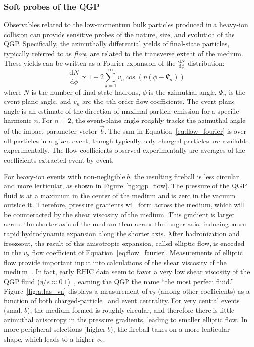 \subsubsection{Soft probes of the QGP}

Observables related to the low-momentum bulk particles produced in a heavy-ion collision can provide sensitive probes of the nature, size, and evolution of the QGP.
Specifically, the azimuthally differential yields of final-state particles, typically referred to as \textit{flow}, are related to the transverse extent of the medium.
These yields can be written as a Fourier expansion of the $\frac{\mathrm{d}N}{\mathrm{d}\phi}$ distribution:
\begin{equation}
    \label{eq:flow_fourier}
    \frac{\mathrm{d}N}{\mathrm{d}\phi}
    \propto 1 + 2\sum_{n=1}^{\infty}
    v_n\cos\left(n(\phi-\Psi_n)\right)
\end{equation}
where $N$ is the number of final-state hadrons, $\phi$ is the azimuthal angle, $\Psi_n$ is the event-plane angle, and $v_n$ are the $n$th-order flow coefficients.
The event-plane angle is an estimate of the direction of maximal particle emission for a specific harmonic $n$.
For $n=2$, the event-plane angle roughly tracks the azimuthal angle of the impact-parameter vector $\vec{b}$.
The sum in Equation~\ref{eq:flow_fourier} is over all particles in a given event, though typically only charged particles are available experimentally.
The flow coefficients observed experimentally are averages of the coefficients extracted event by event.

For heavy-ion events with non-negligible $b$, the resulting fireball is less circular and more lenticular, as shown in Figure~\ref{fig:qgp_flow}.
The pressure of the QGP fluid is at a maximum in the center of the medium and is zero in the vacuum outside it.
Therefore, pressure gradients will form across the medium, which will be counteracted by the shear viscosity of the medium.
This gradient is larger across the shorter axis of the medium than across the longer axis, inducing more rapid hydrodynamic expansion along the shorter axis.
After hadronization and freezeout, the result of this anisotropic expansion, called elliptic flow, is encoded in the $v_2$ flow coefficient of Equation~\ref{eq:flow_fourier}.
Measurements of elliptic flow provide important input into calculations of the shear viscosity of the medium~\cite{QGP:Review3}.
In fact, early RHIC data seem to favor a very low shear viscosity of the QGP fluid ($\eta / s \approx 0.1$)~\cite{QGP:RHICetas}, earning the QGP the name ``the most perfect fluid.''
Figure~\ref{fig:atlas_vn} displays a measurement of $v_2$ (among other coefficients) as a function of both charged-particle \PT\ and event centrality.
For very central events (small $b$), the medium formed is roughly circular, and therefore there is little azimuthal anisotropy in the pressure gradients, leading to smaller elliptic flow.
In more peripheral selections (higher $b$), the fireball takes on a more lenticular shape, which leads to a higher $v_2$.

